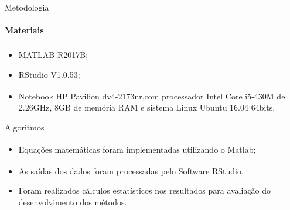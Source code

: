 \documentclass[]{beamer}
\begin{document}
	\begin{frame}{Metodologia}
		\framesubtitle{Materiais}
		\begin{itemize}
			\item MATLAB\textsuperscript{\textregistered} R2017B;
			\item RStudio V1.0.53;
			\item Notebook HP\textsuperscript{\textregistered}  Pavilion dv4-2173nr,com processador 
			Intel\textsuperscript{\textregistered}  Core i5-430M de 2.26GHz,  8GB de memória RAM e sistema 
			Linux Ubuntu 16.04 64bits. 
		\end{itemize}
	\end{frame}


\begin{frame}{Algoritmos}
	\begin{itemize}
		\item Equações matemáticas foram implementadas utilizando o Matlab\textsuperscript{\textregistered};
		\item As saídas dos dados foram processadas pelo Software RStudio\textsuperscript{\textregistered}.
		\item Foram realizados cálculos estatísticos nos resultados para avaliação do desenvolvimento dos 
		métodos.
	\end{itemize}
\end{frame}
\end{document}
